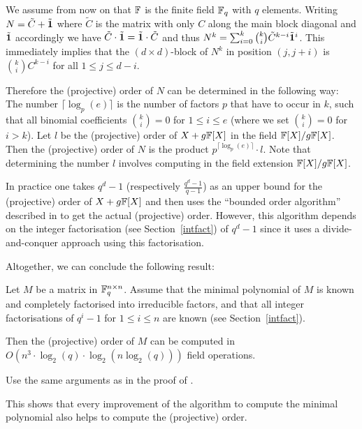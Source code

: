 We assume from now on that $\mathbb{F}$ is the finite field $\mathbb{F}_q$ with $q$
elements.
Writing $N = \tilde C + \tilde {\mathbf{1}}$ where $\tilde C$ is the matrix
with only $C$ along the main block diagonal and $\tilde {\mathbf{1}}$
accordingly we have $\tilde C \cdot \tilde {\mathbf{1}} = \tilde {\mathbf{1}} \cdot \tilde C$
and thus $N^k = \sum_{i=0}^k {k \choose i} \tilde C^{k-i} \tilde
{\mathbf{1}}^i$. This immediately implies that the $(d \times d)$-block
of $N^k$ in position $(j,j+i)$ is ${k \choose i}C^{k-i}$ for all
$1 \le j \le d-i$. 

Therefore the (projective) order of $N$ can be determined in the
following way: The number $\lceil \log_p(e)\rceil$ is the number
of factors $p$ that have to occur in $k$, such that all binomial
coefficients ${k \choose i} = 0$ for $1 \le i \le e$ (where we set ${k
\choose i} = 0$ for $i > k$). Let $l$ be the (projective) order of
$X+g\mathbb{F}[X]$ in the field $\mathbb{F}[X]/g\mathbb{F}[X]$. Then the (projective) order of
$N$ is the product $p^{\lceil \log_p(e) \rceil} \cdot l$. Note that
determining the number $l$ involves computing in the field extension
$\mathbb{F}[X]/g\mathbb{F}[X]$.

In practice one takes $q^d-1$ (respectively $\frac{q^d-1}{q-1}$) 
as an upper bound
for the (projective) order of $X+g\mathbb{F}[X]$ and then uses the ``bounded order
algorithm'' described in \cite[Section 2]{CellLeedOrder} to get the
actual (projective) order. However, this algorithm depends on the
integer factorisation (see Section~\ref{intfact}) 
of $q^d-1$ since it uses a divide-and-conquer
approach using this factorisation.

Altogether, we can conclude the following result:

\begin{Prop}
Let $M$ be a matrix in $\mathbb{F}_q^{n \times n}$. Assume that the 
minimal polynomial of $M$ is known and completely factorised into
irreducible factors, and that all integer factorisations of $q^i-1$
for $1 \le i \le n$ are known (see Section~\ref{intfact}). 

Then the (projective) order of $M$ can be
computed in $O(n^3 \cdot \log_2(q) \cdot \log_2(n\log_2(q)))$
field operations.
\end{Prop}
\proofbeg Use the same arguments as in the proof of 
\cite[\textsc{Order Algorithm}]{CellLeedOrder}. 
\proofend

\begin{Rem}
This shows that every improvement of the algorithm to compute the
minimal polynomial also helps to compute the (projective) order.
\end{Rem}


